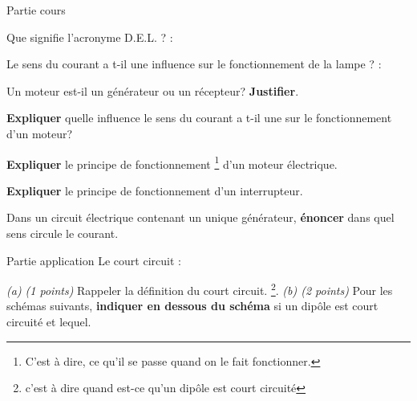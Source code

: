 \documentclass[11pt]{exam}		%
\begin{document}
{\huge Partie cours}
	\begin{questions}
		\question[1] 
		Que signifie l'acronyme D.E.L. ? : \dotfill

		\question[1] 
		Le sens du courant a t-il une 
		influence sur le fonctionnement 
		de la lampe ? : \dotfill

		\question[1\half] 
		Un moteur est-il un générateur ou un récepteur? 
		\textbf{Justifier}.

		\question[1\half] 
		\textbf{Expliquer} quelle influence le sens du 
		courant a t-il une sur le fonctionnement d'un moteur? 

		\question[2] 
		\textbf{Expliquer} le principe de fonctionnement
										\footnote{
											C'est à dire, ce qu'il se passe quand on le fait fonctionner.
											}
			d'un moteur électrique.

		\question[2]
		\textbf{Expliquer} le principe de fonctionnement
		d'un interrupteur.

		\question[2] 
		Dans un circuit électrique contenant un unique générateur,
		\textbf{énoncer} dans quel sens circule 
		le courant.



\newpage
{\huge Partie application}
	\question[3] Le court circuit :

	\textit{(a) (1 points)} Rappeler la définition du court circuit.
	\footnote{c'est à dire quand est-ce qu'un dipôle est court circuité}.
	\textit{(b) (2 points)} 
	Pour les schémas suivants, \textbf{indiquer en dessous du schéma} si un dipôle est court circuité et lequel.
	

\end{questions}
\end{document}
